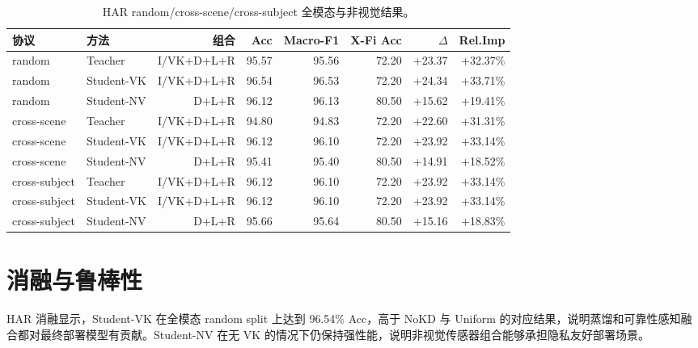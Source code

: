 \documentclass[UTF8,10pt,a4paper]{ctexart}
\newcommand{\better}[1]{\textcolor{ImpBlue}{#1}}
\begin{document}
\begin{table}[H]\centering\scriptsize
\caption{HAR random/cross-scene/cross-subject 全模态与非视觉结果。}
\begin{tabular}{llrrrrrr}
\toprule
协议 & 方法 & 组合 & Acc & Macro-F1 & X-Fi Acc & $\Delta$ & Rel.Imp\\
\midrule
random & Teacher & I/VK+D+L+R & 95.57 & 95.56 & 72.20 & \better{+23.37} & \better{+32.37\%}\\
random & Student-VK & I/VK+D+L+R & 96.54 & 96.53 & 72.20 & \better{+24.34} & \better{+33.71\%}\\
random & Student-NV & D+L+R & 96.12 & 96.13 & 80.50 & \better{+15.62} & \better{+19.41\%}\\
cross-scene & Teacher & I/VK+D+L+R & 94.80 & 94.83 & 72.20 & \better{+22.60} & \better{+31.31\%}\\
cross-scene & Student-VK & I/VK+D+L+R & 96.12 & 96.10 & 72.20 & \better{+23.92} & \better{+33.14\%}\\
cross-scene & Student-NV & D+L+R & 95.41 & 95.40 & 80.50 & \better{+14.91} & \better{+18.52\%}\\
cross-subject & Teacher & I/VK+D+L+R & 96.12 & 96.10 & 72.20 & \better{+23.92} & \better{+33.14\%}\\
cross-subject & Student-VK & I/VK+D+L+R & 96.12 & 96.10 & 72.20 & \better{+23.92} & \better{+33.14\%}\\
cross-subject & Student-NV & D+L+R & 95.66 & 95.64 & 80.50 & \better{+15.16} & \better{+18.83\%}\\
\bottomrule
\end{tabular}
\end{table}

\section{消融与鲁棒性}
HAR 消融显示，Student-VK 在全模态 random split 上达到 96.54\% Acc，高于 NoKD 与 Uniform 的对应结果，说明蒸馏和可靠性感知融合都对最终部署模型有贡献。Student-NV 在无 VK 的情况下仍保持强性能，说明非视觉传感器组合能够承担隐私友好部署场景。
\end{document}
